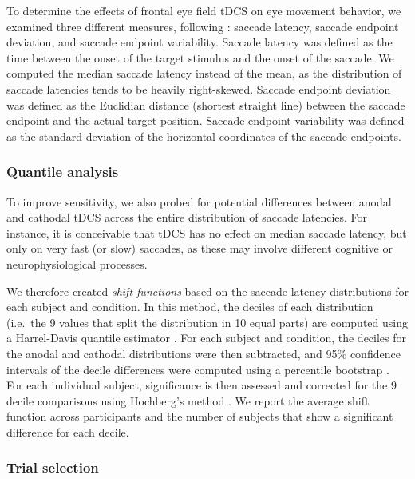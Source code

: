 \documentclass[11pt,english,]{memoir}
\begin{document}
To determine the effects of frontal eye field tDCS on eye movement behavior, we examined three different measures, following \textcite{Kanai2012}: saccade latency, saccade endpoint deviation, and saccade endpoint variability. Saccade latency was defined as the time between the onset of the target stimulus and the onset of the saccade. We computed the median saccade latency instead of the mean, as the distribution of saccade latencies tends to be heavily right-skewed. Saccade endpoint deviation was defined as the Euclidian distance (shortest straight line) between the saccade endpoint and the actual target position. Saccade endpoint variability was defined as the standard deviation of the horizontal coordinates of the saccade endpoints.

\hypertarget{quantile-analysis}{%
\subsubsection{Quantile analysis}\label{quantile-analysis}}

To improve sensitivity, we also probed for potential differences between anodal and cathodal tDCS across the entire distribution of saccade latencies. For instance, it is conceivable that tDCS has no effect on median saccade latency, but only on very fast (or slow) saccades, as these may involve different cognitive or neurophysiological processes.

We therefore created \emph{shift functions} \autocite{R-rogme} based on the saccade latency distributions for each subject and condition. In this method, the deciles of each distribution (i.e.~the 9 values that split the distribution in 10 equal parts) are computed using a Harrel-Davis quantile estimator \autocite{Harrel1982}. For each subject and condition, the deciles for the anodal and cathodal distributions were then subtracted, and 95\% confidence intervals of the decile differences were computed using a percentile bootstrap \autocite{Wilcox2012}. For each individual subject, significance is then assessed and corrected for the 9 decile comparisons using Hochberg's method \autocite{Hochberg1988}. We report the average shift function across participants and the number of subjects that show a significant difference for each decile.

\hypertarget{trial-selection}{%
\subsubsection{Trial selection}\label{trial-selection}}
\end{document}
